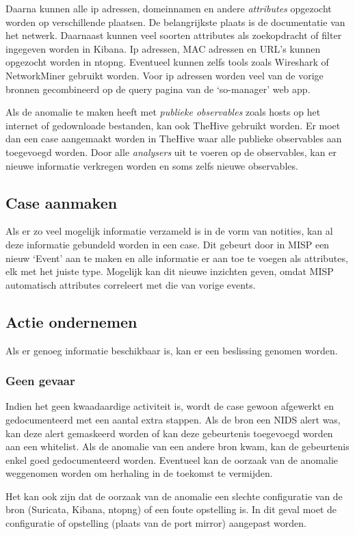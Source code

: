 \documentclass[a4paper,12pt]{report}
\begin{document}
Daarna kunnen alle ip adressen, domeinnamen en andere \emph{attributes} opgezocht worden op verschillende plaatsen.
De belangrijkste plaats is de documentatie van het netwerk.
Daarnaast kunnen veel soorten attributes als zoekopdracht of filter ingegeven worden in Kibana.
Ip adressen, MAC adressen en URL's kunnen opgezocht worden in ntopng.
Eventueel kunnen zelfs tools zoals Wireshark of NetworkMiner gebruikt worden.
Voor ip adressen worden veel van de vorige bronnen gecombineerd op de query pagina van de `so-manager' web app.

Als de anomalie te maken heeft met \emph{publieke observables} zoals hosts op het internet of gedownloade bestanden, kan ook TheHive gebruikt worden.
Er moet dan een case aangemaakt worden in TheHive waar alle publieke observables aan toegevoegd worden.
Door alle \emph{analysers} uit te voeren op de observables, kan er nieuwe informatie verkregen worden en soms zelfs nieuwe observables.

\subsection{Case aanmaken}
Als er zo veel mogelijk informatie verzameld is in de vorm van notities, kan al deze informatie gebundeld worden in een case.
Dit gebeurt door in MISP een nieuw `Event' aan te maken en alle informatie er aan toe te voegen als attributes, elk met het juiste type.
Mogelijk kan dit nieuwe inzichten geven, omdat MISP automatisch attributes correleert met die van vorige events.

\subsection{Actie ondernemen}
Als er genoeg informatie beschikbaar is, kan er een beslissing genomen worden.

\subsubsection{Geen gevaar}
Indien het geen kwaadaardige activiteit is, wordt de case gewoon afgewerkt en gedocumenteerd met een aantal extra stappen.
Als de bron een NIDS alert was, kan deze alert gemaskeerd worden of kan deze gebeurtenis toegevoegd worden aan een whitelist.
Als de anomalie van een andere bron kwam, kan de gebeurtenis enkel goed gedocumenteerd worden.
Eventueel kan de oorzaak van de anomalie weggenomen worden om herhaling in de toekomst te vermijden.

Het kan ook zijn dat de oorzaak van de anomalie een slechte configuratie van de bron (Suricata, Kibana, ntopng) of een foute opstelling is.
In dit geval moet de configuratie of opstelling (plaats van de port mirror) aangepast worden.
\end{document}
